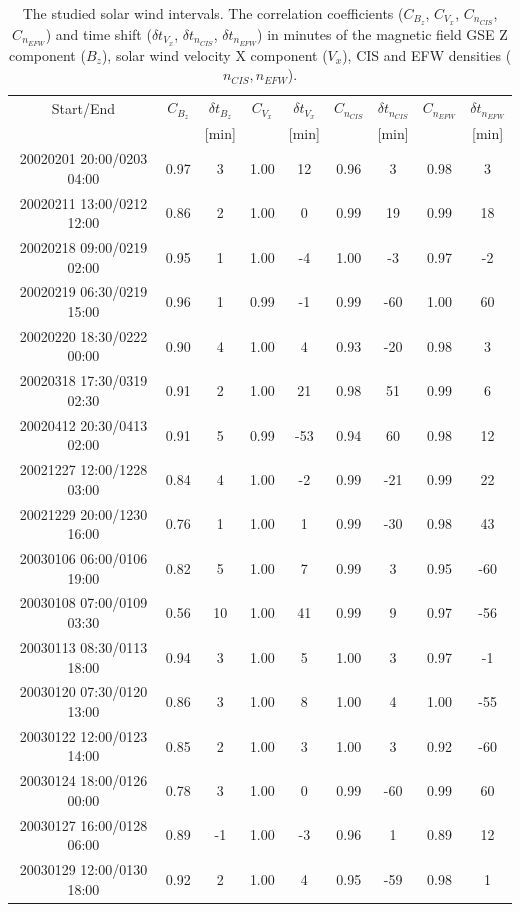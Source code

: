 \documentclass[linenumbers,draft]{agujournal}
\begin{document}
\begin{table}[h]
\setlength{\tabcolsep}{3pt}
\centering
\begin{tabular}{c||cc|cc|cc|cc}
\hline
Start/End & $C_{B_{z}}$ & $\delta t_{B_{z}}$ & $C_{V_{x}}$ & $\delta t_{V_{x}}$ & $C_{n_{CIS}}$ & $\delta t_{n_{CIS}}$ & $C_{n_{EFW}}$ & $\delta t_{n_{EFW}}$ \\
& & [min] & & [min] & & [min] & & [min] \\
\hline
20020201 20:00/0203 04:00 & 0.97 & 3 & 1.00 & 12 & 0.96 & 3 & 0.98 & 3 \\
20020211 13:00/0212 12:00 & 0.86 & 2 & 1.00 & 0 & 0.99 & 19 & 0.99 & 18 \\
20020218 09:00/0219 02:00 & 0.95 & 1 & 1.00 & -4 & 1.00 & -3 & 0.97 & -2 \\
20020219 06:30/0219 15:00 & 0.96 & 1 & 0.99 & -1 & 0.99 & -60 & 1.00 & 60 \\
20020220 18:30/0222 00:00 & 0.90 & 4 & 1.00 & 4 & 0.93 & -20 & 0.98 & 3 \\
20020318 17:30/0319 02:30 & 0.91 & 2 & 1.00 & 21 & 0.98 & 51 & 0.99 & 6 \\
20020412 20:30/0413 02:00 & 0.91 & 5 & 0.99 & -53 & 0.94 & 60 & 0.98 & 12 \\
20021227 12:00/1228 03:00 & 0.84 & 4 & 1.00 & -2 & 0.99 & -21 & 0.99 & 22 \\
20021229 20:00/1230 16:00 & 0.76 & 1 & 1.00 & 1 & 0.99 & -30 & 0.98 & 43 \\
20030106 06:00/0106 19:00 & 0.82 & 5 & 1.00 & 7 & 0.99 & 3 & 0.95 & -60 \\
20030108 07:00/0109 03:30 & 0.56 & 10 & 1.00 & 41 & 0.99 & 9 & 0.97 & -56 \\
20030113 08:30/0113 18:00 & 0.94 & 3 & 1.00 & 5 & 1.00 & 3 & 0.97 & -1 \\
20030120 07:30/0120 13:00 & 0.86 & 3 & 1.00 & 8 & 1.00 & 4 & 1.00 & -55 \\
20030122 12:00/0123 14:00 & 0.85 & 2 & 1.00 & 3 & 1.00 & 3 & 0.92 & -60 \\
20030124 18:00/0126 00:00 & 0.78 & 3 & 1.00 & 0 & 0.99 & -60 & 0.99 & 60 \\
20030127 16:00/0128 06:00 & 0.89 & -1 & 1.00 & -3 & 0.96 & 1 & 0.89 & 12 \\
20030129 12:00/0130 18:00 & 0.92 & 2 & 1.00 & 4 & 0.95 & -59 & 0.98 & 1 \\
\hline
\end{tabular}
\caption{The studied solar wind intervals. The correlation coefficients ($C_{B_{z}}$, $C_{V_{x}}$, $C_{n_{CIS}}$, $C_{n_{EFW}}$) and time shift ($\delta t_{V_{x}}$, $\delta t_{n_{CIS}}$, $\delta t_{n_{EFW}}$) in minutes of the magnetic field GSE Z component ($B_z$), solar wind velocity X component ($V_x$), CIS and EFW densities ($n_{CIS}, n_{EFW}$).\label{tab:sw}}
\end{table}
\end{document}

